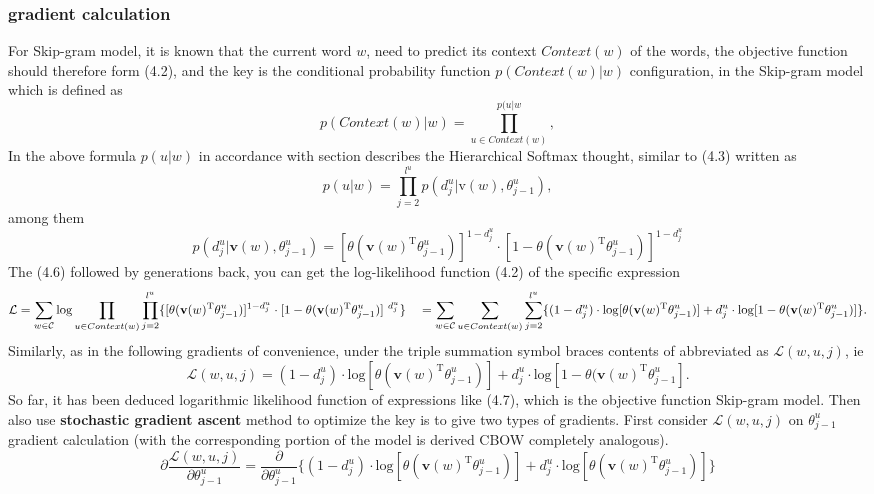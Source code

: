 \subsubsection {gradient calculation} 
For Skip-gram model, it is known that the current word $w$, need to predict its context $Context(w)$ of the words, the objective function should therefore form (4.2), and the key is the conditional probability function $p(Context(w)|w)$ configuration, in the Skip-gram model which is defined as
$$p(Context(w)|w)=\prod_{u\in Context(w)}^{p(u|w},$$
In the above formula $p(u|w)$ in accordance with section describes the Hierarchical Softmax thought, similar to (4.3) written as
$$p(u|w)=\prod_{j = 2}^{l^u}p(d^u_j|\text{v}(w),\theta^u_{j-1}), $$
among them
\begin{equation}
p(d^u_j|\mathbf{v}(w),\theta^u_{j-1})=[\theta(\mathbf{v}(w)^{\mathrm{T}}\theta^u_{j-1})]^{1-d^u_j}\cdot[1-\theta(\mathbf{v}(w)^{\mathrm{T}}\theta^u_{j-1})]^{1-d^u_j}
\end{equation}
The (4.6) followed by generations back, you can get the log-likelihood function (4.2) of the specific expression
\begin{equation}
\mathcal{L}=\sum_{w\in\mathcal{C}}\mathrm{log}\prod_{u\in Context(w)}\prod_{j=2}^{l^u}\{[\theta(\mathbf{v}(w)^{\mathrm{T}}\theta^u_{j-1})]^{1-d^u_j}\cdot[1-\theta(\mathbf{v}(w)^{\mathrm{T}}\theta^u_{j-1})]^{\ d^u_j}\} \\
\ \ \ =\sum_{w\in\mathcal{C}}\sum_{u\in Context(w)}\sum_{j=2}^{l^u}\{(1-d^u_j)\cdot\mathrm{log}[\theta(\mathbf{v}(w)^{\mathrm{T}}\theta^u_{j-1})]+d^u_j\cdot\mathrm{log}[1-\theta(\mathbf {v}(w)^{\mathrm{T}}\theta^u_{j-1})]\}.
\end{equation}
Similarly, as in the following gradients of convenience, under the triple summation symbol braces contents of abbreviated as $\mathcal{L}(w,u,j)$, ie
$$\mathcal{L}(w,u,j)=(1-d^u_j)\cdot\mathrm{log}[\theta(\mathbf{v}(w)^{\mathrm{T}}\theta^u_{j-1})]+d^u_j\cdot\mathrm{log}[1-\theta(\mathbf{v}(w)^{\mathrm{T}}\theta^u_{j-1}]. $$
So far, it has been deduced logarithmic likelihood function of expressions like (4.7), which is the objective function Skip-gram model. Then also use \textbf{stochastic gradient ascent} method to optimize the key is to give two types of gradients.
First consider $\mathcal{L}(w,u,j)$ on $\theta^u_{j-1}$ gradient calculation (with the corresponding portion of the model is derived CBOW completely analogous).
$$\partial\frac{\mathcal{L}(w, u, j)}{\partial\theta^u_{j-1}}=\frac{\partial}{\partial\theta^u_{j-1}}\{(1-d^u_j)\cdot\mathrm{log}[\theta(\mathbf{v}(w)^{\mathrm{T}}\theta^u_{j-1})]+d^u_j\cdot\mathrm{log}[\theta(\mathbf{v}(w)^{\mathrm{T}}\theta^u_{j-1})]\}$$


